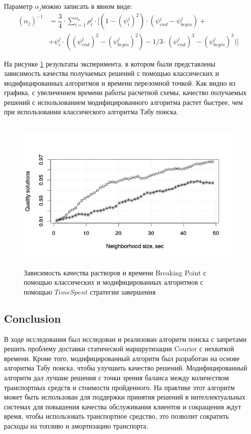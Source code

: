 \documentclass[]{TAACpaper}
\begin{document}
 Параметр $\alpha_j$можно записать в явном виде:
  \begin{equation} \label{norm_cond}
 \begin{split}
 (\alpha_j)^{-1} & = \dfrac{3}{4} \cdot \sum\limits_{i=1}^{n_{\rho}} \rho^j_i \cdot [(1 - (\psi^j_i)^2) \cdot (\psi^j_{end} - \psi^j_{begin}) + \\
 & + \psi^j_i \cdot ((\psi^j_{end})^2 - (\psi^j_{begin})^2) - 1/3 \cdot (\psi^j_{end})^3 - (\psi^j_{begin})^3)]
 \end{split}
 \end{equation}
 
На рисунке \ref{aba:fig5} результаты эксперимента, в котором были представлены зависимость качества получаемых решений с помощью классических и модифицированных алгоритмов и времени переломной точкой. Как видно из графика, с увеличением времени работы расчетной схемы, качество получаемых решений с использованием модифицированного алгоритма растет быстрее, чем при использовании классического алгоритма Табу поиска.
 
 \begin{figure}[h]
 	\hfil\includegraphics[height=3.0in]{images/tabu_mod.png}\hfil
 	\caption
 	{Зависимость качества растворов и времени Breaking Point с помощью классических и модифицированных алгоритмов с помощью $ TimeSpent $ стратегии завершения}
 	\label{aba:fig5}
 \end{figure}
 
 
\subsection{Conclusion}
В ходе исследования был исследован и реализован алгоритм поиска с запретами решить проблему доставки статической маршрутизации Courier с нехваткой времени. Кроме того, модифицированный алгоритм был разработан на основе алгоритма Табу поиска, чтобы улучшить качество решений. Модифицированный алгоритм дал лучшие решения с точки зрения баланса между количеством транспортных средств и стоимости пройденного. На практике этот алгоритм может быть использован для поддержки принятия решений в интеллектуальных системах для повышения качества обслуживания клиентов и сокращения ждут время, чтобы использовать транспортное средство, это позволит сократить расходы на топливо и амортизацию транспорта.
\end{document}

